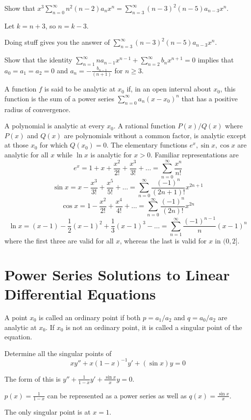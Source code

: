 \documentclass[../diffeq.tex]{subfiles}
\begin{document}
\begin{example}
    Show that $x^3\sum_{n=0}^{\infty} n^2(n-2)a_nx^n = \sum_{n=3}^{\infty}(n-3)^2(n-5)a_{n-3}x^n$.

    Let $k=n+3$, so $n=k-3$.

    Doing stuff gives you the answer of $\sum_{n=3}^{\infty}(n-3)^2(n-5)a_{n-3}x^n$.
\end{example}

\ex Show that the identity $\sum_{n=1}^{\infty}na_{n-1}x^{n-1}+\sum_{n=2}^{\infty}b_nx^{n+1}=0$ implies that $a_0=a_1=a_2=0$ and $a_n=-\frac{b_{n-1}}{(n+1)}$ for $n\geq 3$.

\begin{definition}
    A function $f$ is said to be analytic at $x_0$ if, in an open interval about $x_0$, this function is the sum of a power series $\sum_{n=0}^{\infty}a_n(x-x_0)^n$ that has a positive radius of convergence.
\end{definition}

A polynomial is analytic at every $x_0$. A rational function $P(x)/Q(x)$ where $P(x)$ and $Q(x)$ are polynomials without a common factor, is analytic except at those $x_0$ for which $Q(x_0)=0$.
The elementary functions $e^x,\sin x,\cos x$ are analytic for all $x$ while $\ln x$ is analytic for $x>0$. Familiar representations are 
\[ e^x = 1+x+\frac{x^2}{2!}+\frac{x^3}{3!}+\dots = \sum_{n=0}^{\infty} \frac{x^n}{n!} \]
\[ \sin x = x-\frac{x^3}{3!}+\frac{x^5}{5!}+\dots = \sum_{n=0}^{\infty} \frac{(-1)^n}{(2n+1)!}x^{2n+1} \]
\[ \cos x = 1-\frac{x^2}{2!}+\frac{x^4}{4!}+\dots = \sum_{n=0}^{\infty} \frac{(-1)^n}{(2n)!}x^{2n} \]
\[ \ln x = (x-1)-\frac{1}{2}(x-1)^2+\frac{1}{3}(x-1)^3 - \dots = \sum_{n=1}^{\infty}\frac{(-1)^{n-1}}{n}(x-1)^n \]
where the first three are valid for all $x$, whereas the last is valid for $x$ in $(0,2]$.



\section{Power Series Solutions to Linear Differential Equations}
\begin{definition}
    A point $x_0$ is called an ordinary point if both $p=a_1/a_2$ and $q=a_0/a_2$ are analytic at $x_0$. If $x_0$ is not an ordinary point, it is called a singular point of the equation.
\end{definition}

\begin{example}
    Determine all the singular points of 
    \[ xy''+x(1-x)^{-1}y'+(\sin x)y=0 \]

    The form of this is $y''+\frac{1}{1-x}y'+\frac{\sin x}{x}y=0$.

    $p(x)=\frac{1}{1-x}$ can be represented as a power series as well as $q(x)=\frac{\sin x}{x}$.

    The only singular point is at $x=1$.
\end{example}
\end{document}
